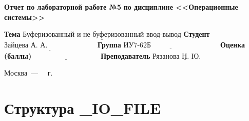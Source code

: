 \documentclass[12pt]{report}
\begin{document}
\begin{titlepage}
		\begin{center}
			\noindent\begin{minipage}{1.1\textwidth}\centering
				\Large\textbf{  Отчет по лабораторной работе №5}\newline
				\textbf{по дисциплине <<Операционные системы>>}\newline\newline\newline
			\end{minipage}
		\end{center}
		
		\noindent\textbf{Тема} $\underline{\text{Буферизованный и не буферизованный ввод-вывод}}$\newline\newline
		\noindent\textbf{Студент} $\underline{\text{Зайцева А. А.~~~~~~~~~~~~~~~~~~~~}}$\newline\newline
		\noindent\textbf{Группа} $\underline{\text{ИУ7-62Б~~~~~~~~~~~~~~~~~~~~~~~~~~~~}}$\newline\newline
		\noindent\textbf{Оценка (баллы)} $\underline{\text{~~~~~~~~~~~~~~~~~~~~~~~~~~~}}$\newline\newline
		\noindent\textbf{Преподаватель} $\underline{\text{Рязанова Н. Ю.~~~~~~~}}$\newline\newline\newline
		
		\begin{center}
			\vfill
			Москва~---~\the\year
			~г.
		\end{center}
	\end{titlepage}


\chapter*{Структура \_IO\_FILE}
\end{document}
